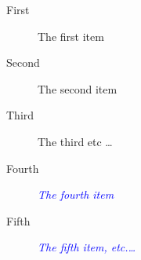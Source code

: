 \documentclass{article}
\newcommand{\myitem}[2]{\item[#1] \textcolor{blue}{\emph{#2}}}
\begin{document}
\lipsum[1]
\begin{description}
  \item[First] The first item
  \item[Second] The second item
  \item[Third] The third etc \ldots
  \myitem{Fourth}{The fourth item}
  \myitem{Fifth}{The fifth item, etc.\ldots}
\end{description}

\lipsum[3]
\end{document}
